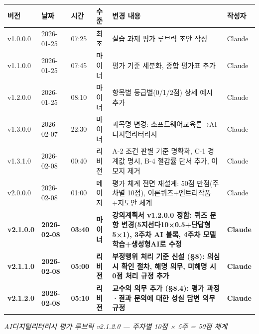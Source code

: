 \documentclass[a4paper,11pt]{ltjsarticle}
\begin{document}
{\scriptsize\noindent
\begin{tabularx}{\textwidth}{|p{1.2cm}|p{1.5cm}|p{0.8cm}|p{1cm}|X|p{0.8cm}|}
\hline
\textbf{버전} & \textbf{날짜} & \textbf{시간} & \textbf{수준} & \textbf{변경 내용} & \textbf{작성자} \\ \hline
v1.0.0.0 & 2026-01-25 & 07:25 & 최초 & 실습 과제 평가 루브릭 초안 작성 & Claude \\ \hline
v1.1.0.0 & 2026-01-25 & 07:45 & 마이너 & 평가 기준 세분화, 종합 평가표 추가 & Claude \\ \hline
v1.2.0.0 & 2026-01-25 & 08:10 & 마이너 & 항목별 등급별(0/1/2점) 상세 예시 추가 & Claude \\ \hline
v1.3.0.0 & 2026-02-07 & 22:30 & 마이너 & 과목명 변경: 소프트웨어교육론→AI디지털리터러시 & Claude \\ \hline
v1.3.1.0 & 2026-02-08 & 00:40 & 리비전 & A-2 조건 판별 기준 명확화, C-1 경계값 명시, B-4 절감률 단서 추가, 이모지 제거 & Claude \\ \hline
v2.0.0.0 & 2026-02-08 & 01:00 & 메이저 & 평가 체계 전면 재설계: 50점 만점(주차별 10점), 이론퀴즈+엔트리작품+지도안 체계 & Claude \\ \hline
\textbf{v2.1.0.0} & \textbf{2026-02-08} & \textbf{03:40} & \textbf{마이너} & \textbf{강의계획서 v1.2.0.0 정합: 퀴즈 문항 변경(5지선다10×0.5+단답형5×1), 3주차 AI 블록, 4주차 모델 학습+생성형AI로 수정} & \textbf{Claude} \\ \hline
\textbf{v2.1.1.0} & \textbf{2026-02-08} & \textbf{05:00} & \textbf{리비전} & \textbf{부정행위 처리 기준 신설 (§8): 의심 시 확인 절차, 해명 의무, 미해명 시 0점 처리 규정 추가} & \textbf{Claude} \\ \hline
\textbf{v2.1.2.0} & \textbf{2026-02-08} & \textbf{05:10} & \textbf{리비전} & \textbf{교수의 의무 추가 (§8.4): 평가 과정·결과 문의에 대한 성실 답변 의무 규정} & \textbf{Claude} \\ \hline
\end{tabularx}
}

\vspace{2em}
\begin{center}
\textit{AI디지털리터러시 평가 루브릭 v2.1.2.0 --- 주차별 10점 × 5주 = 50점 체계}
\end{center}
\end{document}
